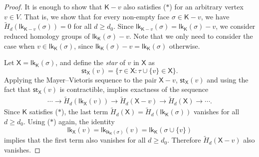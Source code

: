 \documentclass[10pt]{amsart}
\newcommand{\lk}{\mathsf{lk}}
\newcommand{\st}{\mathsf{st}}
\theoremstyle{definition}
\begin{document}
	\begin{proof}
		It is enough to show that $\mathsf{K}-v$ also satisfies ($\ast$) for an arbitrary vertex $v\in V$. That is, we show that for every non-empty face $\sigma \in \mathsf{K}-v$, we have $\tilde{H}_d(\lk_{\mathsf{K}-v}(\sigma))=0$ for all $d\geq d_0$. Since $\lk_{\mathsf{K}-v}(\sigma)=\lk_\mathsf{K}(\sigma)-v$, we consider reduced homology groups of $\lk_\mathsf{K}(\sigma)-v$. Note that we only need to consider the case when $v \in \lk_\mathsf{K}(\sigma)$, since $\lk_\mathsf{K}(\sigma)-v=\lk_\mathsf{K}(\sigma)$ otherwise.
		
		Let $\mathsf{X}=\lk_\mathsf{K}(\sigma)$, and define the {\em star} of $v$ in $\mathsf{X}$ as
		\[\st_\mathsf{X}(v)=\{\tau\in \mathsf{X}: \tau\cup \{v\}\in \mathsf{X} \}.\]
		Applying the Mayer--Vietoris sequence to the pair $\mathsf{X}-v$, $\st_\mathsf{X}(v)$ and using the fact that $\st_\mathsf{X}(v)$ is contractible, implies exactness of the sequence
		\begin{align*}\label{mayer-vietoris}
		\cdots \rightarrow \tilde{H}_d(\lk_\mathsf{X}(v)) \rightarrow  \tilde{H}_d(\mathsf{X} - v) \rightarrow \tilde{H}_d(\mathsf{X})\rightarrow \cdots.
		\end{align*}
		Since $\mathsf{K}$ satisfies ($\ast$), the last term $\tilde{H}_d(\mathsf{X})=\tilde{H}_d(\lk_\mathsf{K}(\sigma))$ vanishes for all $d\geq d_0$. Using ($\ast$) again, the identity 
		\[ \lk_\mathsf{X}(v)=\lk_{\lk_\mathsf{K}(\sigma)}(v)=\lk_\mathsf{K}(\sigma \cup \{v\})\]
		implies that the first term also vanishes for all $d\geq d_0$. Therefore $\tilde{H}_d(\mathsf{X}-v)$ also vanishes.
	\end{proof}
	
\end{document}
